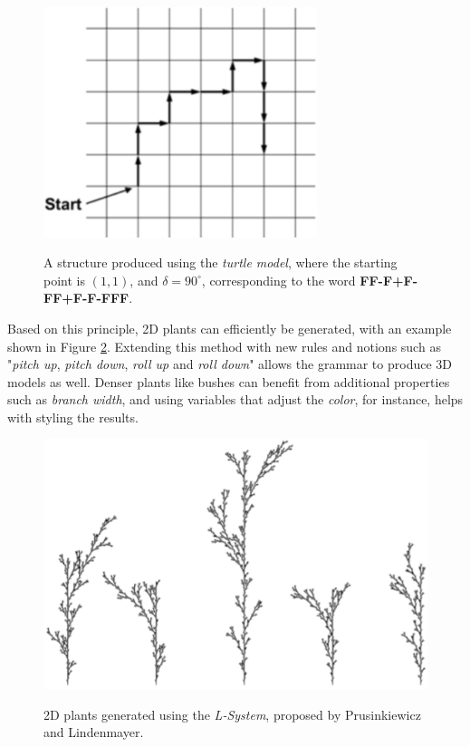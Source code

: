 \begin{figure}[htp]
    \centering
    \includegraphics[width = 8cm]{figures/turtleModel.png}
    \caption{A structure produced using the \textit{turtle model}, where the starting point is \((1, 1)\), and \(\delta = 90^{\circ}\), corresponding to the word \textbf{FF-F+F-FF+F-F-FFF}.}
    \cite{freiknecht2017survey}
    \label{fig:turtleModel}
\end{figure}

Based on this principle, 2D plants can efficiently be generated, with an example shown in Figure \ref{fig:plants}. Extending this method with new rules and notions such as "\textit{pitch up}, \textit{pitch down}, \textit{roll up} and \textit{roll down}" allows the grammar to produce 3D models as well\cite{freiknecht2017survey}. Denser plants like bushes can benefit from additional properties such as \textit{branch width}, and using variables that adjust the \textit{color}, for instance, helps with styling the results.

\begin{figure}[htp]
    \centering
    \includegraphics[width = 12cm]{figures/plants.png}
    \caption{2D plants generated using the \textit{L-System}, proposed by Prusinkiewicz and Lindenmayer.}
    \cite{freiknecht2017survey}
    \label{fig:plants}
\end{figure}

